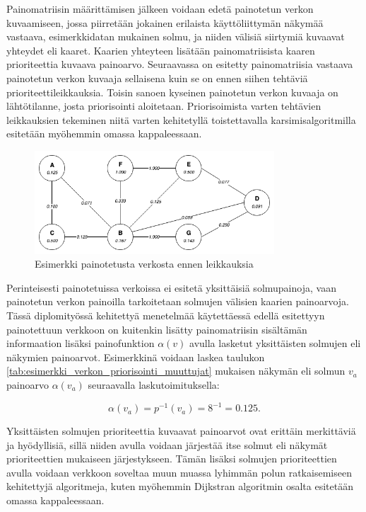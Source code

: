   Painomatriisin määrittämisen jälkeen voidaan edetä painotetun verkon kuvaamiseen, jossa piirretään jokainen erilaista käyttöliittymän näkymää vastaava, esimerkkidatan mukainen solmu, ja niiden välisiä siirtymiä kuvaavat yhteydet eli kaaret.
  Kaarien yhteyteen lisätään painomatriisista kaaren prioriteettia kuvaava painoarvo.
  Seuraavassa on esitetty painomatriisia vastaava painotetun verkon kuvaaja sellaisena kuin se on ennen siihen tehtäviä prioriteettileikkauksia.
  Toisin sanoen kyseinen painotetun verkon kuvaaja on lähtötilanne, josta priorisointi aloitetaan.
  Priorisoimista varten tehtävien leikkauksien tekeminen niitä varten kehitetyllä toistettavalla karsimisalgoritmilla esitetään myöhemmin omassa kappaleessaan.

  \begin{figure}[H]
    \centering
    \includegraphics[width=0.8\textwidth]{assets/painotettu-verkko-ennen.png}
    \caption{Esimerkki painotetusta verkosta ennen leikkauksia}
    \label{fig:painotettu-verkko-ennen}
  \end{figure}

  Perinteisesti painotetuissa verkoissa ei esitetä yksittäisiä solmupainoja, vaan painotetun verkon painoilla tarkoitetaan solmujen välisien kaarien painoarvoja.
  Tässä diplomityössä kehitettyä menetelmää käytettäessä edellä esitettyyn painotettuun verkkoon on kuitenkin lisätty painomatriisin sisältämän informaation lisäksi painofunktion \(\alpha(v)\) avulla lasketut yksittäisten solmujen eli näkymien painoarvot.
  Esimerkkinä voidaan laskea taulukon \ref{tab:esimerkki_verkon_priorisointi_muuttujat} mukaisen näkymän eli solmun \(v_a\) painoarvo \(\alpha(v_a)\) seuraavalla laskutoimituksella:

  \begin{equation} \label{eq:5_5_3}
    \alpha(v_a) = p^{-1}(v_a) = 8^{-1}  = 0.125
    \text{.}
  \end{equation}

  Yksittäisten solmujen prioriteettia kuvaavat painoarvot ovat erittäin merkittäviä ja hyödyllisiä, sillä niiden avulla voidaan järjestää itse solmut eli näkymät prioriteettien mukaiseen järjestykseen.
  Tämän lisäksi solmujen prioriteettien avulla voidaan verkkoon soveltaa muun muassa lyhimmän polun ratkaisemiseen kehitettyjä algoritmeja, kuten myöhemmin Dijkstran algoritmin osalta esitetään omassa kappaleessaan.

